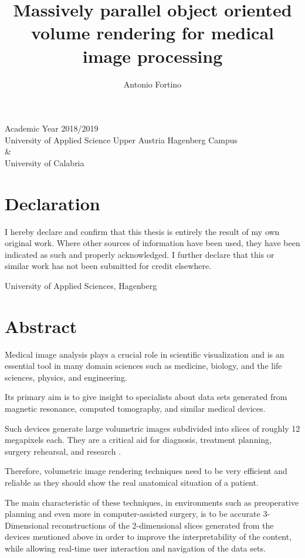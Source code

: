 \documentclass[12pt,a4paper]{extarticle}
\author{Antonio Fortino}
\title{Massively parallel object oriented volume rendering for medical image processing}
\newcommand{\linespace}{\vspace{8pt}}
\begin{document}
\maketitle
\begin{center}
Academic Year 2018/2019\\
University of Applied Science Upper Austria Hagenberg Campus\\
\&\\
University of Calabria
\end{center}
\pagebreak
\fancyhf{}
\fancyhead[R]{\thepage}
\section*{Declaration}
\noindent
I hereby declare and confirm that this thesis is entirely the result of my own original work. 
Where other sources of information have been used, they have been indicated as such and properly 
acknowledged. I further declare that this or similar work has not been submitted for credit elsewhere.
\vspace{10mm}

\noindent
University of Applied Sciences, Hagenberg 
\vspace{12mm}

\noindent
\theauthor

\pagebreak
\tableofcontents
\pagebreak

\section*{Abstract} 
Medical image analysis plays a crucial role in scientific visualization and is an essential tool in many domain sciences such as medicine, biology, and the life sciences, physics, and engineering.

Its primary aim is to give insight to specialists about data sets generated from magnetic resonance, computed tomography, and similar medical devices.

Such devices generate large volumetric images subdivided into slices of roughly 12 megapixels each. They are a critical aid for diagnosis, treatment planning, surgery rehearsal, and research \cite{VISINMED:1}.

Therefore, volumetric image rendering techniques need to be very efficient and reliable as they should show the real anatomical situation of a patient.

The main characteristic of these techniques, in environments such as preoperative planning and even more in computer-assisted surgery, is to be accurate 3-Dimensional reconstructions of the 2-dimensional slices generated from the devices mentioned above in order to improve the interpretability of the content, while allowing real-time user interaction and navigation of the data sets.
\linespace
\end{document}
